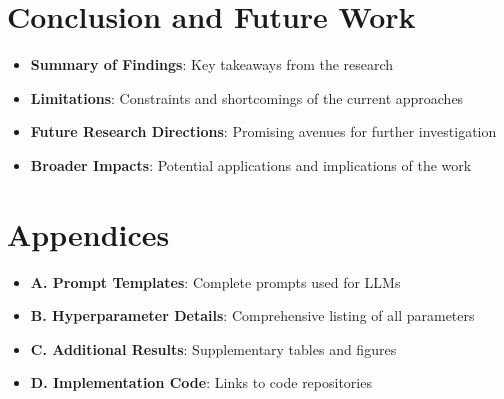 \documentclass[a4paper,12pt]{extarticle}
\begin{document}
\section{Conclusion and Future Work}
\begin{itemize}
\item \textbf{Summary of Findings}: Key takeaways from the research
\item \textbf{Limitations}: Constraints and shortcomings of the current approaches
\item \textbf{Future Research Directions}: Promising avenues for further investigation
\item \textbf{Broader Impacts}: Potential applications and implications of the work
\end{itemize}

\printbibliography

\section*{Appendices}
\begin{itemize}
\item \textbf{A. Prompt Templates}: Complete prompts used for LLMs
\item \textbf{B. Hyperparameter Details}: Comprehensive listing of all parameters
\item \textbf{C. Additional Results}: Supplementary tables and figures
\item \textbf{D. Implementation Code}: Links to code repositories
\end{itemize}
\end{document}
